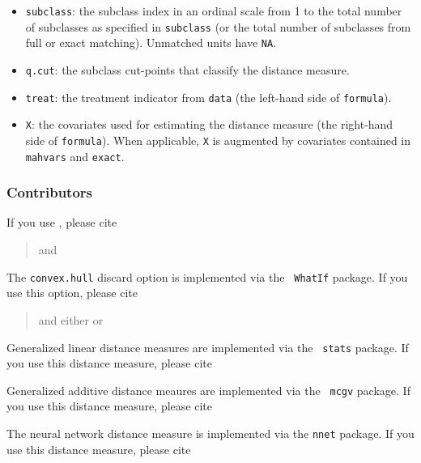 \begin{itemize}
\item \texttt{subclass}: the subclass index in an ordinal scale from 1
  to the total number of subclasses as specified in \texttt{subclass}
  (or the total number of subclasses from full or exact matching).
  Unmatched units have \texttt{NA}.
  
\item \texttt{q.cut}: the subclass cut-points that classify the
  distance measure.
  
\item \texttt{treat}: the treatment indicator from \texttt{data} (the
  left-hand side of \texttt{formula}).
 
\item \texttt{X}: the covariates used for estimating the distance
  measure (the right-hand side of \texttt{formula}).  When applicable,
  \texttt{X} is augmented by covariates contained in \texttt{mahvars}
  and \texttt{exact}.
\end{itemize}

\subsubsection{Contributors}

If you use \MatchIt, please cite
\begin{verse}
and 
\end{verse}

The {\tt convex.hull} discard option is implemented via the {\tt
  WhatIf} package.  If you use this option, please cite
\begin{verse}
and either
or
\end{verse} 

Generalized linear distance measures are implemented via the {\tt
stats} package.  If you use this distance measure, please cite 
\begin{verse}
\end{verse}

Generalized additive distance meaures are implemented via the {\tt
  mcgv} package.  If you use this distance measure, please cite
\begin{verse}
\end{verse}  

The neural network distance measure is implemented via the {\tt nnet}
package.  If you use this distance measure, please cite
\begin{verse}
\end{verse}

